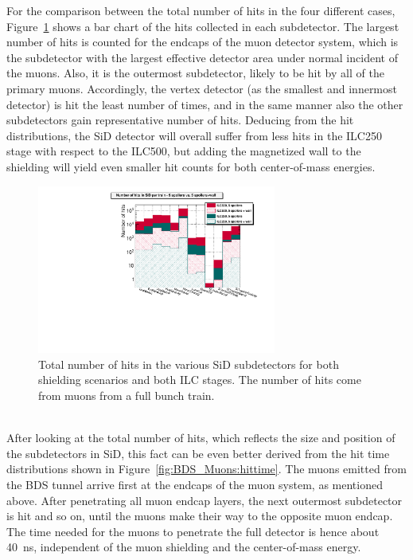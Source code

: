 For the comparison between the total number of hits in the four different cases, Figure~\ref{fig:BDS_Muons:hits} shows a bar chart of the hits collected in each subdetector.
The largest number of hits is counted for the endcaps of the muon detector system, which is the subdetector with the largest effective detector area under normal incident of the muons.
Also, it is the outermost subdetector, likely to be hit by all of the primary muons.
Accordingly, the vertex detector (as the smallest and innermost detector) is hit the least number of times, and in the same manner also the other subdetectors gain representative number of hits.
Deducing from the hit distributions, the SiD detector will overall suffer from less hits in the ILC250 stage with respect to the ILC500, but adding the magnetized wall to the shielding will yield even smaller hit counts for both center-of-mass energies.
\begin{figure}[h]
\centering
\includegraphics[width=0.7\textwidth]{Figures/BDS_muons/Hits_in_SiD_subdetectors_MuonSpoilerStudy.pdf}
\caption[Number of muon hits in the SiD subdetectors]{Total number of hits in the various SiD subdetectors for both shielding scenarios and both ILC stages.
The number of hits come from muons from a full bunch train.}
\label{fig:BDS_Muons:hits}
\end{figure}
\\After looking at the total number of hits, which reflects the size and position of the subdetectors in SiD, this fact can be even better derived from the hit time distributions shown in Figure~\ref{fig:BDS_Muons:hittime}.
The muons emitted from the BDS tunnel arrive first at the endcaps of the muon system, as mentioned above.
After penetrating all muon endcap layers, the next outermost subdetector is hit and so on, until the muons make their way to the opposite muon endcap.
The time needed for the muons to penetrate the full detector is hence about \SI{40}{\nano\second}, independent of the muon shielding and the center-of-mass energy.
